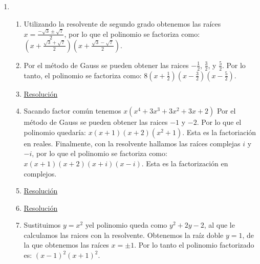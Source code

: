 \documentclass[a4paper]{article}
\newcommand{\exercise}{\item}
\newcommand{\df}[2]{\displaystyle\frac{#1}{#2}}
\begin{document}
\begin{enumerate}
\begin{enumerate} [label=(\alph*)]
		\item El polinomio resultante es $\alpha R(x)^2 - S(x)= \alpha (x-1)^2 - (2x^2-5x)= (\alpha-2) x^2 + (4-2\alpha) x + \alpha$ y necesitamos que tenga grado 1, ya que $gr\left(R(x)\right)=1$. Para ello el coeficiente cuadrático debe ser nulo, es decir $\alpha=2$. Pero reemplazando ese valor podemos observar que la condición no se cumple ya que $\alpha=2$ también anula el coeficiente lineal y el polinomio resultante queda $0x^2+0x+2$ que tiene grado $0$.
		\item $Q(\gamma)=2 \gamma^2-4\gamma = (4)-1= P(4)$ por lo que obtenemos la ecuación $2 \gamma^2-4\gamma -3 = 0$, de donde despejamos los valores de $\gamma = 1 \pm \sqrt{\df{5}{2}}$.
		\item $\gamma=-7$. \href{https://youtu.be/09D5Z3dcaXc}{Resolución}
		\item $\alpha=6$ y $\beta=6$. \href{https://youtu.be/jE5a43IQ91E}{Resolución}
\end{enumerate}\exercise\begin{enumerate} [label=(\alph*)]		\item Utilizando la resolvente de segundo grado obtenemos las raíces $x=\df{-\sqrt{3}\pm\sqrt{7}}{2}$, por lo que el polinomio se factoriza como: $\left(x+\df{\sqrt{3}+\sqrt{7}}{2}\right)\left(x+\df{\sqrt{3}-\sqrt{7}}{2}\right)$.
		\item Por el método de Gauss se pueden obtener las raices $-\df{1}{2}$, $\df{3}{2}$, y $\df{5}{2}$. Por lo tanto, el polinomio se factoriza como: $8\left(x+\df{1}{2}\right)\left(x-\df{3}{2}\right)\left(x-\df{5}{2}\right)$.
		\item \href{https://youtu.be/ZMBXAdxOleM}{Resolución}
		\item Sacando factor común tenemos $x(x^4+3x^3+3x^2+3x+2)$ Por el método de Gauss se pueden obtener las raices $-1$ y $-2$. Por lo que el polinomio quedaría: $x(x+1)(x+2)(x^2+1)$. Esta es la factoriación en reales. Finalmente, con la resolvente hallamos las raíces complejas $i$ y $-i$, por lo que el polinomio se factoriza como: $x(x+1)(x+2)(x+i)(x-i)$. Esta es la factorización en complejos.
		\item \href{https://youtu.be/1V06bnuaadA}{Resolución}
		\item \href{https://youtu.be/Z1KatpJM2eU}{Resolución}
		\item Sustituimos $y=x^2$ yel polinomio queda como $y^2+2y-2$, al que le calculamos las raices con la resolvente. Obtenemos la raíz doble $y=1$, de la que obtenemos las raíces $x=\pm1$. Por lo tanto el polinomio factorizado es: $(x-1)^2(x+1)^2$. 

\end{enumerate}
\end{enumerate}
\end{document}

